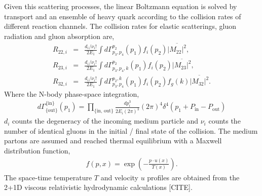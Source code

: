 \documentclass[aps, prc, reprint, amsmath, groupedaddress, nofootinbib]{revtex4-1}
\begin{document}
Given this scattering processes, the linear Boltzmann equation is solved by transport and an ensemble of heavy quark according to the collision rates of different reaction channels.
The collision rates for elastic scatterings, gluon radiation and gluon absorption are,
\begin{eqnarray}\label{eq:rate}
    R_{22,i} &=& \frac{d_i/\nu_i!}{2E_1} \int d \Gamma_{p_3,p_4}^{p_2}(p_1) f_i(p_2)  \overline{|M_{22}|^2},
   \nonumber
  \\
  R_{23,i} &=& \frac{d_i/\nu_i!}{2E_1} \int d \Gamma_{p_3,p_4,k}^{p_2}(p_1) f_i(p_2) 
\overline{|M_{23}|^2},
  	 \nonumber
  \\
  R_{32,i} &=& \frac{d_i/\nu_i!}{2E_1} \int d \Gamma_{p_3,p_4}^{p_2,k}(p_1) f_i(p_2)f_g(k)
\overline{|M_{32}|^2}.
  	 \nonumber
\end{eqnarray}
Where the N-body phase-space integration,
\begin{eqnarray}
\nonumber
d\Gamma_{\{\textrm{out}\}}^{\{\textrm{in}\}}(p_1) = \prod_{\{\textrm{in, out}\}} \frac{dp_i^3}{2E_i(2\pi)^3} (2\pi)^4\delta^4(p_1+P_{\text{in}} - P_{\textrm{out}})
\end{eqnarray}
$d_i$ counts the degeneracy of the incoming medium particle and $\nu_i$ counts the number of identical gluons in the initial / final state of the collision.
The medium partons are assumed and reached thermal equilibrium with a Maxwell distribution function, 
\begin{eqnarray}
f(p,x) = \exp\left(-\frac{p \cdot u(x)}{T(x)}\right).
\end{eqnarray}
The space-time temperature $T$ and velocity $u$ profiles are obtained from the 2+1D viscous relativistic hydrodynamic calculations [CITE].
\end{document}
